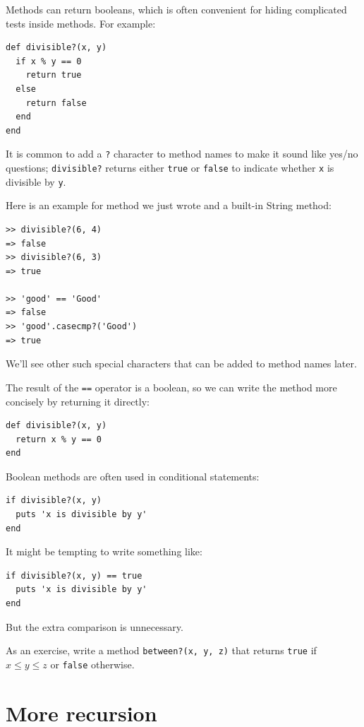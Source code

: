 \documentclass[10pt]{book}
\begin{document}
Methods can return booleans, which is often convenient for hiding
complicated tests inside methods.
For example:

\begin{verbatim}
def divisible?(x, y)
  if x % y == 0
    return true
  else
    return false
  end
end
\end{verbatim}
%
It is common to add a {\tt ?} character to method names to make
it sound like yes/no questions;
\verb"divisible?" returns either {\tt true} or {\tt false}
to indicate whether {\tt x} is divisible by {\tt y}.

Here is an example for method we just wrote and a built-in String method:

\begin{verbatim}
>> divisible?(6, 4)
=> false
>> divisible?(6, 3)
=> true

>> 'good' == 'Good'
=> false
>> 'good'.casecmp?('Good')
=> true
\end{verbatim}
%
We'll see other such special characters that can be added
to method names later.

The result of the {\tt ==} operator is a boolean, so we can write the
method more concisely by returning it directly:

\begin{verbatim}
def divisible?(x, y)
  return x % y == 0
end
\end{verbatim}
%
Boolean methods are often used in conditional statements:

\begin{verbatim}
if divisible?(x, y)
  puts 'x is divisible by y'
end
\end{verbatim}
%
It might be tempting to write something like:

\begin{verbatim}
if divisible?(x, y) == true
  puts 'x is divisible by y'
end
\end{verbatim}
%
But the extra comparison is unnecessary.

As an exercise, write a method \verb"between?(x, y, z)" that
returns {\tt true} if $x \le y \le z$ or {\tt false} otherwise.


\section{More recursion}
\label{more.recursion}
\end{document}
